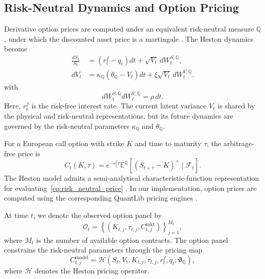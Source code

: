 \documentclass[sigconf,anonymous,review]{acmart}
\begin{document}
\subsection{Risk-Neutral Dynamics and Option Pricing}
\label{sec:heston_risk_neutral}
Derivative option prices are computed under an equivalent risk-neutral measure \(\mathbb{Q}\), under which the discounted asset price is a martingale \cite{heston1993,shreve2004}. The Heston dynamics become
%
\begin{align}
\frac{dS_t}{S_t}
&=
(r_t^{f}-q_t)dt
+
\sqrt{V_t}\,dW_t^{S,\mathbb{Q}},
\label{eq:heston_q_asset}
\\
dV_t
&=
\kappa_{\mathbb{Q}}
\left(
\theta_{\mathbb{Q}}-V_t
\right)dt
+
\xi\sqrt{V_t}\,dW_t^{V,\mathbb{Q}}.
\label{eq:heston_q_variance}
\end{align}
%
with
%
\begin{equation}
dW_t^{S,\mathbb{Q}}
dW_t^{V,\mathbb{Q}}
=
\rho\,dt.
\end{equation}
%
Here, \(r_t^{f}\) is the risk-free interest rate. The current latent variance \(V_t\) is shared by the physical and risk-neutral representations, but its future dynamics are governed by the risk-neutral parameters \(\kappa_{\mathbb{Q}}\) and \(\theta_{\mathbb{Q}}\).

For a European call option with strike \(K\) and time to maturity \(\tau\), the arbitrage-free price is
%
\begin{equation}
C_t(K,\tau)
=
e^{-r_t^{f}\tau}
\mathbb{E}^{\mathbb{Q}}
\left[
\left(
S_{t+\tau}-K
\right)^{+}
\mid
\mathcal{F}_t
\right].
\label{eq:risk_neutral_price}
\end{equation}
%
The Heston model admits a semi-analytical characteristic-function representation for evaluating~\eqref{eq:risk_neutral_price} \cite{heston1993}. In our implementation, option prices are computed using the corresponding QuantLib pricing engines \cite{quantlib}.

At time \(t\), we denote the observed option panel by
%
\begin{equation}
\mathcal{O}_t
=
\left\{
\left(
K_{t,j},
\tau_{t,j},
C_{t,j}^{\mathrm{mkt}}
\right)
\right\}_{j=1}^{M_t},
\end{equation}
%
where \(M_t\) is the number of available option contracts. The option panel constrains the risk-neutral parameters through the pricing map
%
\begin{equation}
C_{t,j}^{\mathrm{model}}
=
\mathcal{H}
\left(
S_t,
V_t,
K_{t,j},
\tau_{t,j},
r_t^{f},
q_t;
\boldsymbol{\vartheta}_{\mathbb{Q}}
\right),
\end{equation}
%
where \(\mathcal{H}\) denotes the Heston pricing operator.
\end{document}
